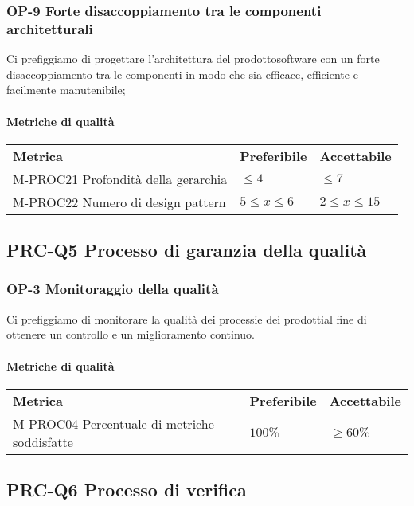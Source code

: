 		\subsubsection{OP-9 Forte disaccoppiamento tra le componenti architetturali}
		Ci prefiggiamo di progettare l'architettura del prodotto\glosp software con un forte disaccoppiamento tra le componenti in modo che sia efficace, efficiente e facilmente manutenibile;
		\paragraph{Metriche di qualità} \mbox{}
		\begin{longtable} {
				>{}p{80mm} 
				>{}p{25mm}
				>{}p{25mm}
			}
			\rowcolor{gray!50}
			\textbf{Metrica} & \textbf{Preferibile} & \textbf{Accettabile} \TBstrut \TBstrut \\
			M-PROC21 Profondità della gerarchia & $\le 4$ & $\le 7$ \TBstrut \\ [2mm]
			M-PROC22 Numero di design pattern & $5 \le x \le 6$ & $2 \le x \le 15$ \TBstrut \\ [2mm]
		\end{longtable}
			
	\subsection{PRC-Q5 Processo di garanzia della qualità}
		\subsubsection{OP-3 Monitoraggio della qualità}
			Ci prefiggiamo di monitorare la qualità dei processi\glosp e dei prodotti\glosp al fine di ottenere un controllo e un miglioramento continuo. 
			\paragraph{Metriche di qualità} \mbox{} 
			\begin{longtable} {
					>{}p{80mm} 
					>{}p{25mm}
					>{}p{25mm}
				}
				\rowcolor{gray!50}
				\textbf{Metrica} & \textbf{Preferibile} & \textbf{Accettabile} \TBstrut \TBstrut \\
				M-PROC04 Percentuale di metriche soddisfatte & $100\%$ & $\ge 60\%$ \TBstrut \\ [2mm]
			\end{longtable}

	\subsection{PRC-Q6 Processo di verifica}
